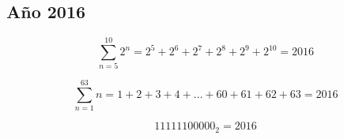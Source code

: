 \documentclass[12pt, a5paper]{article}
\begin{document}
\subsection*{Año 2016}
$$
\sum_{n = 5}^{10} 2^{n} = 2^5 + 2^6 + 2^7 + 2^8 + 2^9 + 2^{10} = 2016
$$

$$
\sum_{n = 1}^{63} {n} = 1 + 2 + 3 + 4 + \ldots + 60 + 61 + 62 + 63 = 2016
$$

$$
11111100000_{2} = 2016
$$
\end{document}
